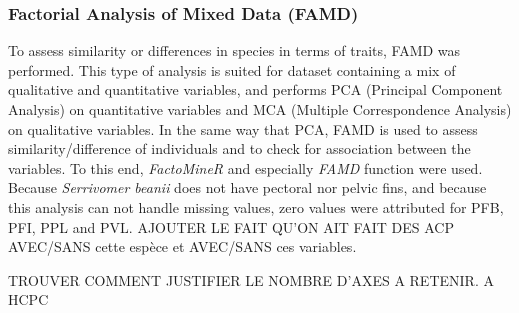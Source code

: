 \subsubsection{Factorial Analysis of Mixed Data (FAMD)}
To assess similarity or differences in species in terms of traits, FAMD was performed. This type of analysis is suited for dataset containing a mix of qualitative and quantitative variables, and performs PCA (Principal Component Analysis) on quantitative variables and MCA (Multiple Correspondence Analysis) on qualitative variables. In the same way that PCA, FAMD is used to assess similarity/difference of individuals and to check for association between the variables. To this end, \emph{FactoMineR} and especially \emph{FAMD} function were used. Because \textit{Serrivomer beanii} does not have pectoral nor pelvic fins, and because this analysis can not handle missing values, zero values were attributed for \textsc{PFB}, \textsc{PFI}, \textsc{PPL} and \textsc{PVL}. AJOUTER LE FAIT QU'ON AIT FAIT DES ACP AVEC/SANS cette espèce et AVEC/SANS ces variables.

 TROUVER COMMENT JUSTIFIER LE NOMBRE D'AXES A RETENIR. A HCPC 